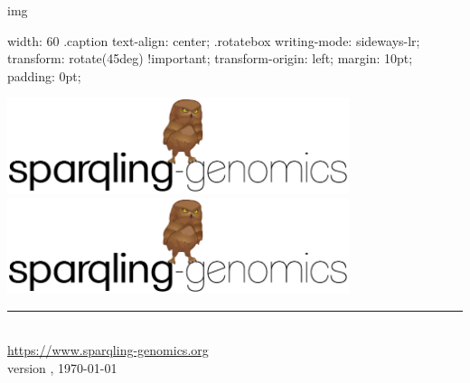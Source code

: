 \documentclass[11pt,a4paper,oneside]{book}
\begin{document}
img { width: 60%
.caption { text-align: center; }
.rotatebox {
  writing-mode: sideways-lr;
  transform: rotate(45deg) !important;
  transform-origin: left;
  margin: 10pt;
  padding: 0pt;
}
\EndCssFile
\fi

\begin{titlepage}
  \vspace*{\fill}
  \begin{center}
    \ifdefined\HCode
    \includegraphics[width=0.75\textwidth]{figures/logo.pdf}~\\
    \else
    \includegraphics[width=0.75\textwidth]{figures/logo.pdf}
    \fi
    \rule{0.75\textwidth}{1.0pt}~\\
    \url{https://www.sparqling-genomics.org}~\\
    \large version \sgversion{}, \today{}
    \ifdefined\HCode
    \else
    ~\\~\\~\\~\\~\\~\\~\\~\\~\\~\\~\\~\\~\\~\\
    \fi
  \end{center}
  \vspace*{\fill}

  \thispagestyle{empty}
\end{titlepage}

}
\end{document}
